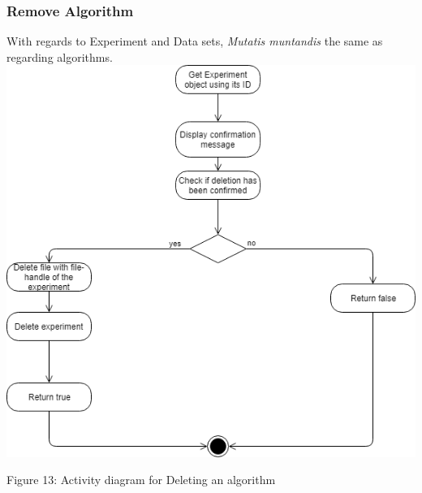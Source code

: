     \subsubsection{Remove Algorithm}
    \par With regards to Experiment and Data sets,
{ \textit{Mutatis muntandis} the same as regarding algorithms.} \newline \newline
    \includegraphics[width=\textwidth]{input_unit/images/delete_activity_diagram.png}
	\begin{center}
	    \small{Figure 13: Activity diagram for Deleting an algorithm }
    \end{center}
    
